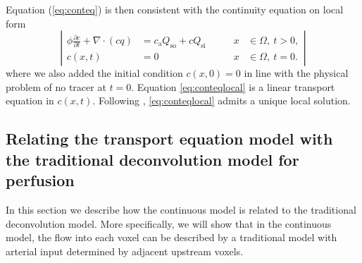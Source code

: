 \documentclass[journal,twocolumn]{IEEEtran}
\newcommand{\Qso}{Q_{\mathrm{so}}}
\newcommand{\Qsi}{Q_{\mathrm{si}}}
\newcommand{\ca}{c_\mathrm{a}}
\begin{document}
	Equation (\ref{eq:conteq}) is then consistent with the continuity equation on local form
	\begin{equation}
		\left\vert
		\begin{alignedat}{2}
			\phi \frac{\partial c}{\partial t} + \nabla \cdot (cq) &= \ca\Qso + c\Qsi \qquad	&x &\in \Omega, \ t>0,  \\
			c(x,t) &= 0 																			 	&x &\in \Omega, \ t=0.
		\end{alignedat}
		\right\vert
		\label{eq:conteqlocal}
	\end{equation}
	where we also added the initial condition $c(x,0) = 0$ in line with the physical problem of no tracer at $t = 0$.
	Equation \eqref{eq:conteqlocal} is a linear transport equation in $c(x,t)$. 
	Following \cite{evans98}, \eqref{eq:conteqlocal} admits a unique local solution.


\subsection{Relating the transport equation model with the traditional deconvolution model for perfusion}\label{sec:NewAndOld}
	In this section we describe how the continuous model is related to the traditional deconvolution model.
	More specifically, we will show that in the continuous model, the flow into each voxel can be described by a traditional model with arterial input determined by adjacent upstream voxels.
	
\end{document}
